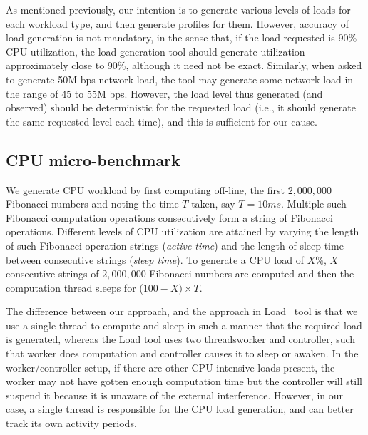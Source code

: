 As mentioned previously, our intention is to generate various levels of loads for each
workload type, and then generate profiles for them. However, accuracy of load generation is not
mandatory, in the sense that, if the load requested is 90\% CPU utilization, the load generation
tool should generate utilization approximately close to 90\%, although it need not be exact. 
Similarly, when asked to generate 50M bps network
load, the tool may generate some network load in the range of 45 to 55M bps. However, the load
level thus generated (and observed) should be deterministic for the requested load (i.e., it
should generate the same requested level each time), and this is sufficient for our cause.

\subsection{CPU micro-benchmark}
We generate CPU workload by first computing off-line, the
first $2,000,000$ Fibonacci numbers and noting 
the time $T$ taken, say $T = 10ms$. Multiple such
Fibonacci computation operations consecutively
form a string of Fibonacci operations.
Different levels of CPU utilization are attained
by varying the length of such Fibonacci operation strings (\textit{active time}) and
the length of sleep time between consecutive strings (\textit{sleep time}). To generate a
CPU load of $X\%$, $X$ consecutive strings of $2,000,000$ Fibonacci numbers are
computed %
and then the computation thread sleeps for 
($100-X) \times T$. 

The difference between our approach, and the approach in Load~\cite{load} tool
is that we use a single thread to compute and sleep in such a manner that the 
required load is generated, whereas the Load tool uses two threads\textemdash{}worker and controller, 
such that worker does computation and controller causes it to sleep or awaken. In
the worker/controller setup, if there are other CPU-intensive loads present, the
worker may not have gotten enough computation time but the controller will still
suspend it because it is unaware of the external interference. However, in 
our case, a single thread is responsible for the CPU load generation, and can
better track its own activity periods.

